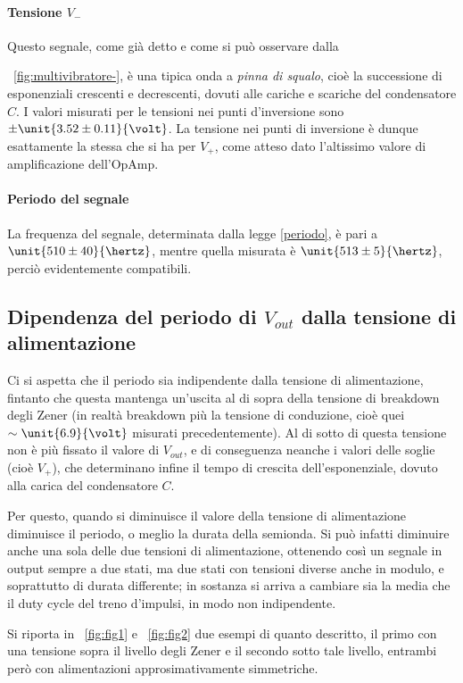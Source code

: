 \documentclass[10pt,a4paper]{article}
\begin{document}
\paragraph{Tensione $V_-$} Questo segnale, come già detto e come si può osservare dalla \figurename{~\ref{fig:multivibratore-}, è una tipica onda a \emph{pinna di squalo}, cioè la successione di esponenziali crescenti e decrescenti, dovuti alle cariche e scariche del condensatore $C$. I valori misurati per le tensioni nei punti d'inversione sono $\pm \unit{3.52 \pm 0.11}{\volt}$.
La tensione nei punti di inversione è dunque esattamente la stessa che si ha per $V_+$, come atteso dato l'altissimo valore di amplificazione dell'OpAmp.

\paragraph{Periodo del segnale} La frequenza del segnale, determinata dalla legge \eqref{periodo}, è pari a $\unit{510 \pm 40}{\hertz}$, mentre quella misurata è $\unit{513 \pm 5}{\hertz}$, perciò evidentemente compatibili.

\subsection{Dipendenza del periodo di $V_{out}$ dalla tensione di alimentazione}
Ci si aspetta che il periodo sia indipendente dalla tensione di alimentazione, fintanto che questa mantenga un'uscita al di sopra della tensione di breakdown degli Zener (in realtà breakdown più la tensione di conduzione, cioè quei $\sim \unit{6.9}{\volt}$ misurati precedentemente).
Al di sotto di questa tensione non è più fissato il valore di $V_{out}$, e di conseguenza neanche i valori delle soglie (cioè $V_+$), che determinano infine il tempo di crescita dell'esponenziale, dovuto alla carica del condensatore $C$.

Per questo, quando si diminuisce il valore della tensione di alimentazione diminuisce il periodo, o meglio la durata della semionda. Si può infatti diminuire anche una sola delle due tensioni di alimentazione, ottenendo così un segnale in output sempre a due stati, ma due stati con tensioni diverse anche in modulo, e soprattutto di durata differente; in sostanza si arriva a cambiare sia la media che il duty cycle del treno d'impulsi, in modo non indipendente.

Si riporta in \figurename{~\ref{fig:fig1}} e \figurename{~\ref{fig:fig2}} due esempi di quanto descritto, il primo con una tensione sopra il livello degli Zener e il secondo sotto tale livello, entrambi però con alimentazioni approsimativamente simmetriche.

}
\end{document}
